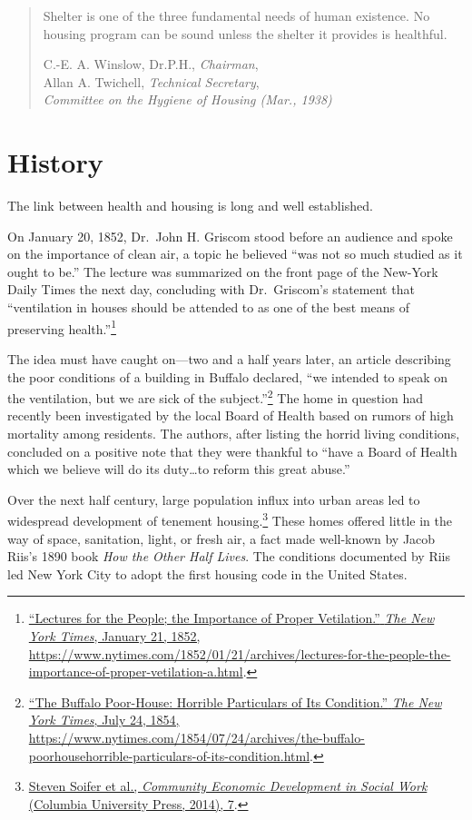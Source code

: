 \documentclass[
  openany]{book}
\begin{document}
\begin{quote}
Shelter is one of the three fundamental needs of human existence. No housing program can be sound unless the shelter it provides is healthful.

C.-E. A. Winslow, Dr.P.H., \emph{Chairman},\\
Allan A. Twichell, \emph{Technical Secretary},\\
\emph{Committee on the Hygiene of Housing (Mar., 1938)}
\end{quote}

\hypertarget{history}{%
\section{History}\label{history}}

The link between health and housing is long and well established.

On January 20, 1852, Dr.~John H. Griscom stood before an audience and spoke on the importance of clean air, a topic he believed ``was not so much studied as it ought to be.'' The lecture was summarized on the front page of the New-York Daily Times the next day, concluding with Dr.~Griscom's statement that ``ventilation in houses should be attended to as one of the best means of preserving health.''\footnote{\protect\hyperlink{ref-lectures1852}{{``Lectures for the People; the Importance of Proper Vetilation.''} \emph{The New York Times}, January 21, 1852, \url{https://www.nytimes.com/1852/01/21/archives/lectures-for-the-people-the-importance-of-proper-vetilation-a.html}}.}

The idea must have caught on---two and a half years later, an article describing the poor conditions of a building in Buffalo declared, ``we intended to speak on the ventilation, but we are sick of the subject.''\footnote{\protect\hyperlink{ref-thebuff1854}{{``The Buffalo Poor-House: Horrible Particulars of Its Condition.''} \emph{The New York Times}, July 24, 1854, \url{https://www.nytimes.com/1854/07/24/archives/the-buffalo-poorhousehorrible-particulars-of-its-condition.html}}.} The home in question had recently been investigated by the local Board of Health based on rumors of high mortality among residents. The authors, after listing the horrid living conditions, concluded on a positive note that they were thankful to ``have a Board of Health which we believe will do its duty\ldots to reform this great abuse.''

Over the next half century, large population influx into urban areas led to widespread development of tenement housing.\footnote{\protect\hyperlink{ref-soifer2014}{Steven Soifer et al., \emph{Community Economic Development in Social Work} (Columbia University Press, 2014), 7}.} These homes offered little in the way of space, sanitation, light, or fresh air, a fact made well-known by Jacob Riis's 1890 book \emph{How the Other Half Lives}. The conditions documented by Riis led New York City to adopt the first housing code in the United States.
\end{document}

